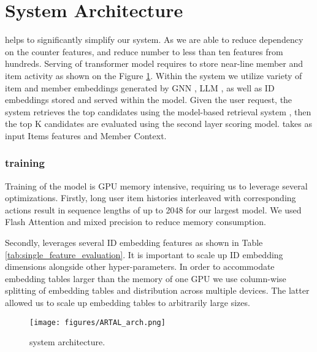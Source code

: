 \section{System Architecture}\label{sec:system_arch}
{\systemname} helps to significantly simplify our system. As we are able to reduce dependency on the counter features, and reduce number to less than ten features from hundreds. 
Serving of transformer model requires to store near-line member and item activity as shown on the Figure \ref{fig:system_arch}.
Within the system we utilize variety of item and member embeddings generated by GNN \cite{LiGNN_paper}, LLM \cite{PEv3_paper}, as well as ID embeddings stored and served within the model. Given the user request, the system retrieves the top candidates using the model-based retrieval system \cite{Linr_paper}, then the top K candidates are evaluated using the second layer {\systemname} scoring model. {\systemname} takes as input Items features and Member Context.




\subsubsection{{\systemname} training}
Training of the {\systemname} model is GPU memory intensive, requiring us to leverage several optimizations. Firstly, long user item histories interleaved with corresponding actions result in sequence lengths of up to 2048 for our largest model. We used Flash Attention and mixed precision to reduce memory consumption.

Secondly, {\systemname} leverages several ID embedding features as shown in Table \ref{tab:single_feature_evaluation}. It is important to scale up ID embedding dimensions alongside other hyper-parameters. In order to accommodate embedding tables larger than the memory of one GPU we use column-wise splitting of embedding tables and distribution across multiple devices. The latter allowed us to scale up embedding tables to arbitrarily large sizes.


\begin{figure}
    \centering
    \texttt{[image: figures/ARTAL\_arch.png]}
    \caption{{\systemname} system architecture.}
    \label{fig:system_arch}
\end{figure}

